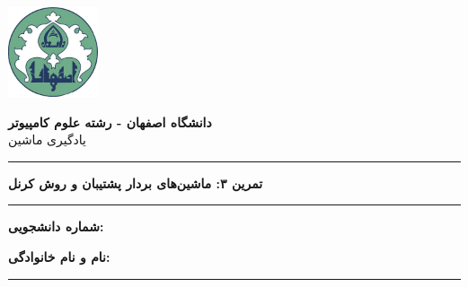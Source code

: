 \begin{center}
	\includegraphics[width=75pt, height=75pt]{./images/isf_uni_logo.png}
\end{center}

\begin{center}
	\begin{minipage}{\textwidth}
		\begin{center}
			\textbf{\Large دانشگاه اصفهان - رشته علوم کامپیوتر \\}
			\Large {یادگیری ماشین}
		\end{center}
		\hrule
		\begin{center}
			\textbf{\huge {تمرین ۳: ماشین‌های بردار پشتیبان و روش کرنل}}
		\end{center}
		\hrule
	\end{minipage}
\end{center}

\begin{flushright}
	\textbf{\large شماره دانشجویی:}
\end{flushright}
\begin{flushright}
	\textbf{\large نام و نام خانوادگی:}
\end{flushright}
\hrule
\vspace{\baselineskip}
\vspace{\baselineskip}